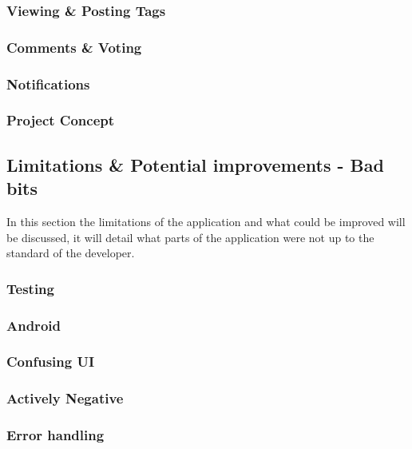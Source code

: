 \subsubsection{Viewing \& Posting Tags}

\subsubsection{Comments \& Voting}

\subsubsection{Notifications}

\subsubsection{Project Concept}


\subsection{Limitations \& Potential improvements - Bad bits}

In this section the limitations of the application and what could be improved will be discussed, it will detail what parts of the application were not up to the standard of the developer.

\subsubsection{Testing}

\subsubsection{Android}


\subsubsection{Confusing UI}

\subsubsection{Actively Negative}

\subsubsection{Error handling}

